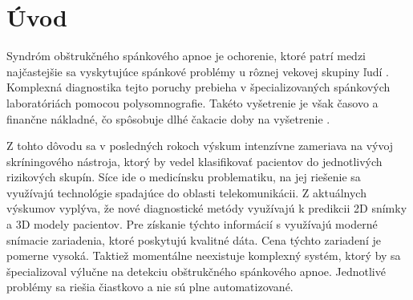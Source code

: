 
\setcounter{page}{1} %
\chapter{Úvod} \label{kap:Uvod}

\pagestyle{fancy}
\fancyhf{}
\fancyfoot[CE,CO]{\thepage}
\renewcommand{\footrulewidth}{1pt}


Syndróm obštrukčného spánkového apnoe je ochorenie, ktoré patrí medzi najčastejšie sa
vyskytujúce spánkové problémy u rôznej vekovej skupiny ľudí \cite{lam2010obstructive}. Komplexná diagnostika tejto poruchy prebieha v špecializovaných spánkových laboratóriách pomocou polysomnografie. Takéto vyšetrenie je však časovo a finančne nákladné, čo spôsobuje dlhé čakacie doby na vyšetrenie \cite{lam2005craniofacial}.

Z tohto dôvodu sa v posledných rokoch výskum intenzívne zameriava na vývoj skríningového nástroja, ktorý by vedel klasifikovať pacientov do jednotlivých rizikových skupín. Síce ide o medicínsku problematiku, na jej riešenie sa využívajú technológie spadajúce do oblasti telekomunikácii. Z aktuálnych výskumov vyplýva, že nové diagnostické metódy využívajú k predikcii 2D snímky a 3D modely pacientov.  
Pre získanie týchto informácií s využívajú moderné snímacie zariadenia, ktoré poskytujú kvalitné dáta. Cena týchto zariadení je pomerne vysoká. Taktiež momentálne neexistuje komplexný systém, ktorý by sa špecializoval výlučne na detekciu obštrukčného spánkového apnoe. Jednotlivé problémy sa riešia čiastkovo a nie sú plne automatizované.     


